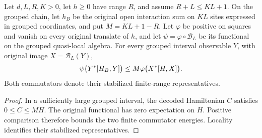 \begin{lemma}
    \label{thm:blocked_commutator_energy_comparison}
    \leanok
    Let $d,L,R,K>0$, let $h\geq0$ have range $R$, and assume $R+L\leq KL+1$.
    On the grouped chain, let $h_B$ be the original open interaction sum on $KL$
    sites expressed in grouped coordinates, and put $M=KL+1-R$.
    Let $\varphi$ be positive on squares and vanish on every original translate
    of $h$, and let $\psi=\varphi\circ\mathcal B_L$ be its functional on the grouped
    quasi-local algebra. For every grouped interval observable $Y$, with original
    image $X=\mathcal B_L(Y)$,
    \begin{align}
        \psi\bigl(Y^*[H_B,Y]\bigr)
        \leq M\varphi\bigl(X^*[H,X]\bigr).
        \notag
    \end{align}
    Both commutators denote their stabilized finite-range representatives.
\end{lemma}
\begin{proof}\leanok
    In a sufficiently large grouped interval, the decoded Hamiltonian $C$ satisfies
    $0\leq C\leq MH$. The original functional has zero expectation on $H$.
    Positive comparison therefore bounds the two finite commutator energies.
    Locality identifies their stabilized representatives.
\end{proof}

